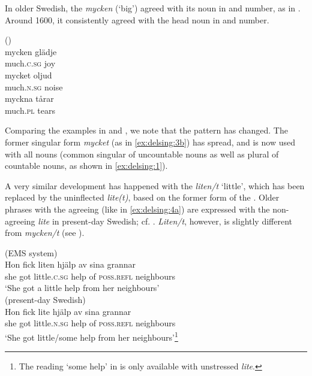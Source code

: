 \documentclass[output=paper]{langscibook}
\begin{document}
In older Swedish, the  \textit{mycken} (‘big’) agreed with its noun in  and number, as in . Around 1600, it consistently agreed with the head noun in  and number.


\ea()\\\label{ex:delsing:3}
\ea\label{ex:delsing:3a}
\gll mycken      glädje\\
much\textsc{.c.sg}    joy \\
\ex\label{ex:delsing:3b}
\gll mycket          oljud\\
    much\textsc{.n.sg}    noise \\
\ex\label{ex:delsing:3c}
\gll myckna      tårar \\
    much\textsc{.pl}  tears \\
\z
\z

Comparing the examples in  and , we note that the  pattern has changed. The former  singular form \textit{mycket} (as in \ref{ex:delsing:3b}) has spread, and is now used with all nouns (common  singular of uncountable nouns as well as plural of countable nouns, as shown in \ref{ex:delsing:1}).\largerpage[2.5]



A very similar development has happened with the  \textit{liten/t} ‘little’, which has been replaced by the uninflected \textit{lite(t)}, based on the former  form of the . Older phrases with the agreeing  (like in \ref{ex:delsing:4a}) are expressed with the non-agreeing  \textit{lite} in present-day Swedish; cf. . \textit{Liten/t}, however, is  slightly different from \textit{mycken/t} (see ).


\ea\label{ex:delsing:4}
\ea\label{ex:delsing:4a}(EMS system)\\
\gll Hon  fick    liten        hjälp  av  sina          grannar\\
she      got  little.\textsc{c.sg}    help  of    \textsc{poss.refl}    neighbours\\
     \glt ‘She got a little help from her neighbours’\\

\ex\label{ex:delsing:4b}(present-day Swedish)\\
\gll Hon    fick    lite        hjälp    av  sina        grannar    \\
      she      got    little.\textsc{n.sg}  help    of  \textsc{poss.refl}  neighbours\\
      \glt ‘She got little/some help from her neighbours’\footnote{The reading ‘some help’ in  is only available with unstressed \textit{lite}.}\\
\z
\z
\end{document}
